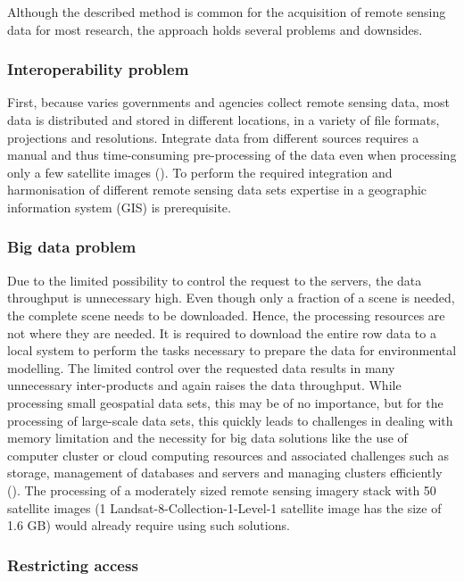 \documentclass[12pt,twoside,a4paper,final]{report}
\begin{document}
Although the described method is common for the acquisition of remote sensing data for most research, the approach holds several problems and downsides.

\subsubsection{Interoperability problem}
First, because varies governments and agencies collect remote sensing data, most data is distributed and stored in different locations, in a variety of file formats, projections and resolutions. Integrate data from different sources requires a manual and thus time-consuming pre-processing of the data even when processing only a few satellite images (\cite{schell2000geodata}). To perform the required integration and harmonisation of different remote sensing data sets expertise in a geographic information system (GIS) is prerequisite.

\subsubsection{Big data problem}

Due to the limited possibility to control the request to the servers, the data throughput is unnecessary high. Even though only a fraction of a scene is needed, the complete scene needs to be downloaded. Hence, the processing resources are not where they are needed. It is required to download the entire row data to a local system to perform the tasks necessary to prepare the data for environmental modelling. The limited control over the requested data results in many unnecessary inter-products and again raises the data throughput. While processing small geospatial data sets, this may be of no importance, but for the processing of large-scale data sets, this quickly leads to challenges in dealing with memory limitation and the necessity for big data solutions like the use of computer cluster or cloud computing resources and associated challenges such as storage, management of databases and servers and managing clusters efficiently (\cite{gorelick2017google}). 
The processing of a moderately sized remote sensing imagery stack with 50 satellite images (1 Landsat-8-Collection-1-Level-1 satellite image has the size of 1.6 GB) would already require using such solutions.

\subsubsection{Restricting access}
\end{document}
